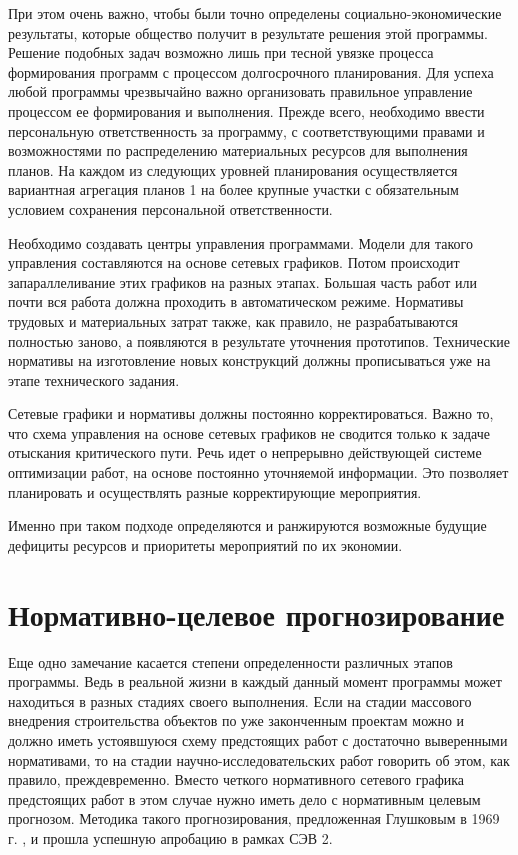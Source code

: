 При этом очень важно, чтобы были точно определены социально-экономические
результаты, которые общество получит в результате решения этой программы.
Решение подобных задач возможно лишь при тесной увязке процесса формирования
программ с процессом долгосрочного планирования. Для успеха любой программы
чрезвычайно важно организовать правильное управление процессом ее формирования и
выполнения. Прежде всего, необходимо ввести персональную ответственность за
программу, с соответствующими правами и возможностями по распределению
материальных ресурсов для выполнения планов. На каждом из следующих уровней
планирования осуществляется вариантная агрегация планов 1 на более крупные
участки с обязательным условием сохранения персональной ответственности.

Необходимо создавать центры управления программами. Модели для такого управления
составляются на основе сетевых графиков. Потом происходит запараллеливание этих
графиков на разных этапах. Большая часть работ или почти вся работа должна
проходить в автоматическом режиме. Нормативы трудовых и материальных затрат
также, как правило, не разрабатываются полностью заново, а появляются в
результате уточнения прототипов. Технические нормативы на изготовление новых
конструкций должны прописываться уже на этапе технического задания.

Сетевые графики и нормативы должны постоянно корректироваться. Важно то, что
схема управления на основе сетевых графиков не сводится только к задаче
отыскания критического пути. Речь идет о непрерывно действующей системе
оптимизации работ, на основе постоянно уточняемой информации. Это позволяет
планировать и осуществлять разные корректирующие мероприятия.

Именно при таком подходе определяются и ранжируются возможные будущие дефициты
ресурсов и приоритеты мероприятий по их экономии.
 
\section{Нормативно-целевое прогнозирование}
 
Еще одно замечание касается степени определенности различных этапов программы.
Ведь в реальной жизни в каждый данный момент программы может находиться в разных
стадиях своего выполнения. Если на стадии массового внедрения строительства
объектов по уже законченным проектам можно и должно иметь устоявшуюся схему
предстоящих работ с достаточно выверенными нормативами, то на стадии
научно-исследовательских работ говорить об этом, как правило, преждевременно.
Вместо четкого нормативного сетевого графика предстоящих работ в этом случае
нужно иметь дело с нормативным целевым прогнозом. Методика такого
прогнозирования, предложенная Глушковым в 1969 г. \cite{b2}, и прошла успешную
апробацию в рамках СЭВ 2. \cite{b3}
 
